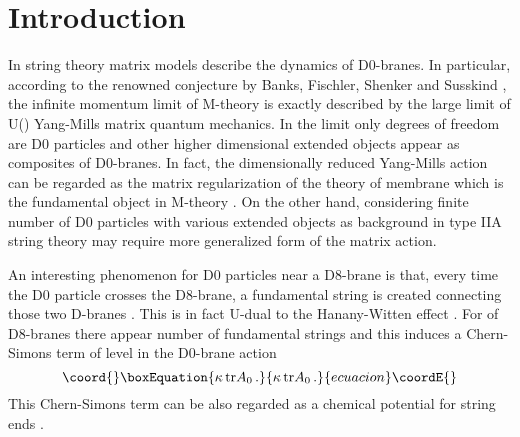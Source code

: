 \documentclass[a4paper,12pt]{article}
\def\tr{\mbox{tr}}
\begin{document}
\section{Introduction}
In string theory \coordHE{} matrix models describe the dynamics of \coordHE{} D0-branes.  In particular, according to
the renowned conjecture by Banks, Fischler, Shenker and Susskind \cite{BFSS},  the infinite momentum limit of
M-theory is exactly described by the large \coordHE{} limit of   U(\coordHE{}) Yang-Mills matrix quantum mechanics.  In the
limit only degrees of freedom are D0 particles and other higher dimensional extended objects appear as composites
of D0-branes. In fact, the dimensionally reduced Yang-Mills  action can be regarded as the matrix regularization
of the theory of membrane  which is the fundamental object in M-theory \cite{HoppePhD}. On the other hand,
considering finite number of D0 particles with various extended objects as background in type IIA string theory
may require more generalized form of the matrix action. \newline




An interesting phenomenon for D0 particles near a D8-brane is that, every time  the D0 particle crosses the
D8-brane, a fundamental string is created connecting  those two D-branes \cite{9705084}. This  is in fact U-dual
to the Hanany-Witten effect \cite{9611230}. For \myHighlight{$\kappa$}\coordHE{} of  D8-branes there appear \myHighlight{$\kappa$}\coordHE{} number of fundamental
strings and this induces a \coordHE{} Chern-Simons term of level \myHighlight{$\kappa$}\coordHE{} in the D0-brane action
\begin{equation}\coord{}\boxEquation{
\kappa\,\tr A_{0}\,.
}{
\kappa\,\tr A_{0}\,.
}{ecuacion}\coordE{}\end{equation}
This Chern-Simons term can be also regarded as  a chemical potential for string ends \cite{0107200}.\newline
\end{document}
